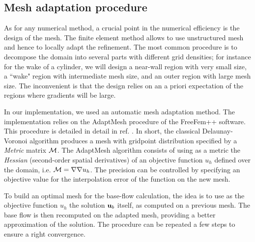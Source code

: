 \documentclass[twocolumn,10pt]{asme2ej}
\begin{document}
\subsection{Mesh adaptation procedure}
\vspace{.2cm}

As for any numerical method, a crucial point in the numerical efficiency is the design of the mesh. The finite element method allows to use unstructured mesh and hence to locally adapt the refinement. %
The most common procedure is to decompose the domain into several parts with different grid densities; for instance for the wake of a cylinder, we will design a near-wall region with very small  size, a ``wake" region with intermediate mesh size, and an outer region with large mesh size. The inconvenient is that the design relies on an a priori expectation of the regions where gradients will be large. 

In our implementation, we used an automatic mesh adaptation method. %
The implementation relies on the AdaptMesh procedure of the FreeFem++ software. This procedure is detailed in detail in ref. \cite{adapt}. 
In short, the classical Delaunay-Voronoi algorithm produces a mesh with gridpoint distribution specified by a {\em Metric } matrix $\cal M$. The AdaptMesh algorithm consists of using as a metric the {\em Hessian} (second-order spatial derivatives) of an objective function $u_h$ defined over the domain, i.e. ${\cal M} = \nabla \nabla u_h$. The precision can be controlled by specifying an objective value for the interpolation error of the function on the new mesh.

To build an optimal mesh for the base-flow calculation, the idea is to use as the objective function $u_h$ the solution ${\bf u}_b$ itself, as computed on a previous mesh.%
The base flow is then recomputed on the adapted mesh, providing a better approximation of the solution. The procedure can be repeated a few steps to ensure a right convergence.
\end{document}
